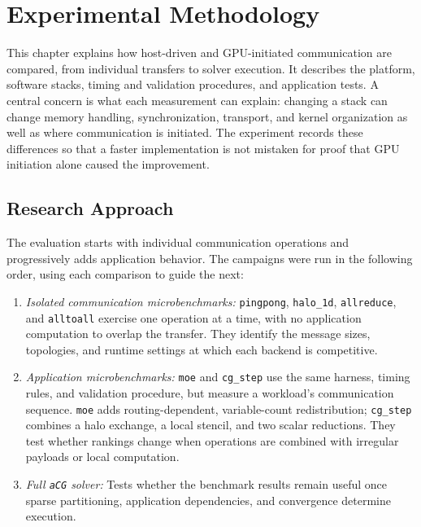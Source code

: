 \chapter{Experimental Methodology}\label{ch:m-methodology}

This chapter explains how host-driven and GPU-initiated communication are compared, from individual transfers to solver execution. It describes the platform, software stacks, timing and validation procedures, and application tests. A central concern is what each measurement can explain: changing a stack can change memory handling, synchronization, transport, and kernel organization as well as where communication is initiated. The experiment records these differences so that a faster implementation is not mistaken for proof that GPU initiation alone caused the improvement.

\section{Research Approach}\label{sec:research-planning-levels}

The evaluation starts with individual communication operations and progressively adds application behavior. The campaigns were run in the following order, using each comparison to guide the next:

\begin{enumerate}
    \item \emph{Isolated communication microbenchmarks:} \texttt{pingpong}, \texttt{halo\_1d}, \texttt{allreduce}, and \texttt{alltoall} exercise one operation at a time, with no application computation to overlap the transfer. They identify the message sizes, topologies, and runtime settings at which each backend is competitive.
    \item \emph{Application microbenchmarks:} \texttt{moe} and \texttt{cg\_step} use the same harness, timing rules, and validation procedure, but measure a workload's communication sequence. \texttt{moe} adds routing-dependent, variable-count redistribution; \texttt{cg\_step} combines a halo exchange, a local stencil, and two scalar reductions. They test whether rankings change when operations are combined with irregular payloads or local computation.
    \item \emph{Full \texttt{aCG} solver:} Tests whether the benchmark results remain useful once sparse partitioning, application dependencies, and convergence determine execution.
\end{enumerate}

